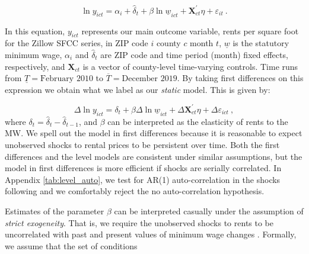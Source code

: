 \begin{equation*} \label{eq:did_lev}
    \ln y_{ict} = \alpha_i + \hat{\delta}_t 
    			+ \beta \ln \underline{w}_{ict}
    			+ \mathbf{X}^{'}_{ct}\eta
    			+ \varepsilon_{it} \ .
\end{equation*}    

In this equation, $y_{ict}$ represents our main outcome variable, rents per square foot 
for the Zillow SFCC series, in ZIP code $i$ county $c$ month $t$, $\underline{w}$ is the 
statutory minimum wage, $\alpha_i$ and $\hat{\delta}_t$ are ZIP code and time period 
(month) fixed effects, respectively, and $\mathbf{X}_{ct}$ is a vector of county-level 
time-varying controls. Time runs from $\underline{T} = \text{February 2010}$ to 
$\overline{T} = \text{December 2019}$. By taking first differences on this expression 
we obtain what we label as our \textit{static} model. This is given by:

\begin{equation}\label{eq:did}
	\Delta \ln y_{ict} = \delta_t
						+ \beta \Delta \ln \underline{w}_{ict}
						+ \Delta \mathbf{X}^{'}_{ct} \eta
						+ \Delta \varepsilon_{ict} \ ,
\end{equation}
where $\delta_t = \hat{\delta}_t - \hat{\delta}_{t-1}$, and $\beta$ can be interpreted 
as the elasticity of rents to the MW. We spell out the model in first differences because 
it is reasonable to expect unobserved shocks to rental prices to be persistent over 
time. Both the first differences and the level models are consistent under similar 
assumptions, but the model in first differences is more efficient if shocks are serially 
correlated. In Appendix \autoref{tab:level_auto}, we test for AR(1) auto-correlation in 
the shocks following \textcite[][chapter 10]{wooldridge2010} and we comfortably reject 
the no auto-correlation hypothesis. 

Estimates of the parameter $\beta$ can be interpreted casually under the assumption of
\textit{strict exogeneity}. That is, we require the unobserved shocks to rents to be 
uncorrelated with past and present values of minimum wage changes 
\parencite[][chapter 10]{wooldridge2010}. Formally, we assume that the set of conditions

